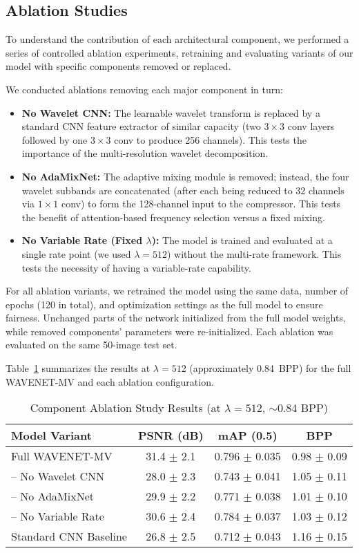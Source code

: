 \documentclass[conference]{IEEEtran}
\begin{document}
\subsection{Ablation Studies}

To understand the contribution of each architectural component, we performed a series of controlled ablation experiments, retraining and evaluating variants of our model with specific components removed or replaced.

We conducted ablations removing each major component in turn:
\begin{itemize}
\item \textbf{No Wavelet CNN:} The learnable wavelet transform is replaced by a standard CNN feature extractor of similar capacity (two $3\times3$ conv layers followed by one $3\times3$ conv to produce 256 channels). This tests the importance of the multi-resolution wavelet decomposition.
\item \textbf{No AdaMixNet:} The adaptive mixing module is removed; instead, the four wavelet subbands are concatenated (after each being reduced to 32 channels via $1\times1$ conv) to form the 128-channel input to the compressor. This tests the benefit of attention-based frequency selection versus a fixed mixing.
\item \textbf{No Variable Rate (Fixed $\lambda$):} The model is trained and evaluated at a single rate point (we used $\lambda=512$) without the multi-rate framework. This tests the necessity of having a variable-rate capability.
\end{itemize}

For all ablation variants, we retrained the model using the same data, number of epochs (120 in total), and optimization settings as the full model to ensure fairness. Unchanged parts of the network initialized from the full model weights, while removed components' parameters were re-initialized. Each ablation was evaluated on the same 50-image test set.

Table~\ref{tab:ablation_results} summarizes the results at $\lambda=512$ (approximately 0.84~BPP) for the full WAVENET-MV and each ablation configuration.

\begin{table}[htbp]
\caption{Component Ablation Study Results (at $\lambda=512$, $\sim$0.84 BPP)}
\label{tab:ablation_results}
\centering
\begin{tabular}{|l|c|c|c|}
\hline
\textbf{Model Variant} & \textbf{PSNR (dB)} & \textbf{mAP (0.5)} & \textbf{BPP} \\
\hline
Full WAVENET-MV       & 31.4 $\pm$ 2.1 & 0.796 $\pm$ 0.035 & 0.98 $\pm$ 0.09 \\
-- No Wavelet CNN     & 28.0 $\pm$ 2.3 & 0.743 $\pm$ 0.041 & 1.05 $\pm$ 0.11 \\
-- No AdaMixNet       & 29.9 $\pm$ 2.2 & 0.771 $\pm$ 0.038 & 1.01 $\pm$ 0.10 \\
-- No Variable Rate   & 30.6 $\pm$ 2.4 & 0.784 $\pm$ 0.037 & 1.03 $\pm$ 0.12 \\
Standard CNN Baseline & 26.8 $\pm$ 2.5 & 0.712 $\pm$ 0.043 & 1.16 $\pm$ 0.15 \\
\hline
\end{tabular}
\end{table}
\end{document}
